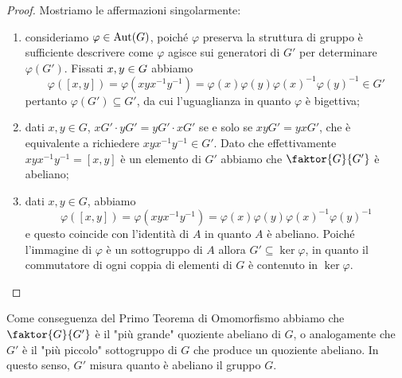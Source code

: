 \documentclass[11pt]{scrartcl}
\begin{document}
\begin{proof}
    Mostriamo le affermazioni singolarmente:
    \begin{enumerate}[(1)]
        \item consideriamo $\varphi \in \operatorname{Aut}(G)$, poiché $\varphi$ preserva la struttura
        di gruppo è sufficiente descrivere come $\varphi$ agisce sui 
        generatori di $G'$ per determinare $\varphi(G')$. 
        Fissati $x, y \in\nolinebreak G$ abbiamo 
        \[
            \varphi([x, y]) = \varphi(xyx^{-1}y^{-1}) = \varphi(x)\varphi(y)
            \varphi(x)^{-1}\varphi(y)^{-1} \in G'
        \]pertanto $\varphi(G') \subseteq G'$, da cui l'uguaglianza in quanto 
        $\varphi$ è bigettiva;
        \item dati $x, y \in G$, $xG'\cdot yG' = yG'\cdot xG'$ se e solo se 
        $xyG' = yxG'$, che è equivalente a richiedere $xyx^{-1}y^{-1} \in G'$. 
        Dato che effettivamente $xyx^{-1}y^{-1} = [x, y]$ è un elemento di $G'$
        abbiamo che $\faktor{G}{G'}$ è abeliano;
        \item dati $x, y \in G$, abbiamo 
        \[
            \varphi([x, y]) = \varphi(xyx^{-1}y^{-1}) = 
        \varphi(x)\varphi(y)\varphi(x)^{-1}\varphi(y)^{-1}
        \]
        e questo coincide con
        l'identità di $A$ in quanto $A$ è abeliano. Poiché l'immagine di $\varphi$
        è un sottogruppo di $A$ allora $G' \subseteq \ker\varphi$, in quanto
        il commutatore di ogni coppia di elementi di $G$ è contenuto in $\ker \varphi$.
    \end{enumerate}
\end{proof}

\begin{remark}
    Come conseguenza del Primo Teorema di Omomorfismo abbiamo che $\faktor{G}{G'}$ è 
    il "più grande" quoziente abeliano di $G$, o analogamente che 
    $G'$ è il "più piccolo" sottogruppo di $G$ che produce un quoziente abeliano.
    In questo senso, $G'$ misura quanto è abeliano il gruppo $G$.
\end{remark}
\end{document}
